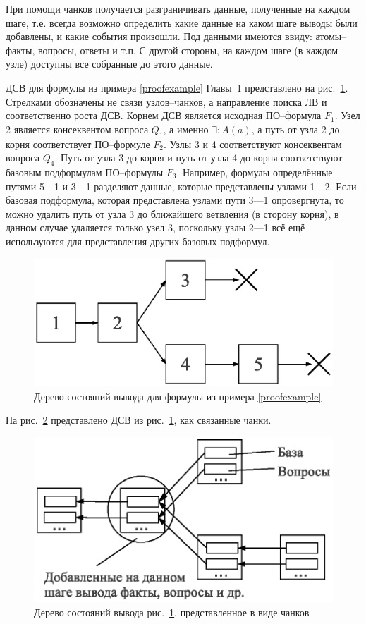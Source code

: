 При помощи чанков получается разграничивать данные, полученные на каждом шаге, т.е. всегда возможно определить какие данные на каком шаге выводы были добавлены, и какие события произошли. Под данными имеются ввиду: атомы--факты, вопросы, ответы и т.п. С другой стороны, на каждом шаге (в каждом узле) доступны все собранные до этого данные.

ДСВ для формулы из примера \ref{proofexample} Главы~1 представлено на рис.~\ref{fig:pst}. Стрелками обозначены не связи узлов--чанков, а направление поиска ЛВ и соответственно роста ДСВ. Корнем ДСВ является исходная ПО--формула $F_1$. Узел 2 является консеквентом вопроса $Q_1$, а именно $\exists\colon A(a)$, а путь от узла 2 до корня соответствует ПО--формуле $F_2$. Узлы 3 и 4 соответствуют консеквентам вопроса $Q_4$. Путь от узла 3 до корня и путь от узла 4 до корня соответствуют базовым подформулам ПО--формулы $F_3$. Например, формулы определённые путями 5---1 и 3---1 разделяют данные, которые представлены узлами 1---2. Если базовая подформула, которая представлена узлами пути 3---1 опровергнута, то можно удалить путь от узла 3 до ближайшего ветвления (в сторону корня), в данном случае удаляется только узел 3, поскольку узлы 2---1 всё ещё используются для представления других базовых подформул.
\begin{figure}[h]
	\centering
	\includegraphics[width=0.4\linewidth]{pics/PST.eps}
	\caption{Дерево состояний вывода для формулы из примера \ref{proofexample}}
	\label{fig:pst}
\end{figure}
На рис.~\ref{fig:pst2} представлено ДСВ из рис.~\ref{fig:pst}, как связанные чанки.
\begin{figure}[h]
	\centering
	\includegraphics[width=0.6\linewidth]{pics/PST2.eps}
	\caption{Дерево состояний вывода рис.~\ref{fig:pst}, представленное в виде чанков}
	\label{fig:pst2}
\end{figure}

